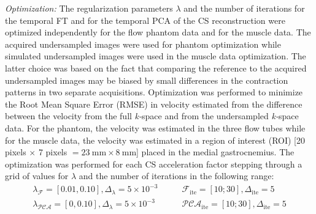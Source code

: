 \textit{Optimization:}
 The regularization parameters $\lambda$ and the number of iterations for the temporal FT and for the temporal PCA of the CS reconstruction were optimized independently for the flow phantom data and for the muscle data. 
 The acquired undersampled images were used for phantom optimization while simulated undersampled images were used in the muscle data optimization. 
 The latter choice was based on the fact that comparing the reference to the acquired undersampled images may be biased by small differences in the contraction patterns in two separate acquisitions. 
 Optimization was performed to minimize the Root Mean Square Error (RMSE) in velocity estimated from the difference between the velocity from the full \mbox{\textit{k-}space} and from the undersampled \mbox{\textit{k-}space} data. 
 For the phantom, the velocity was estimated in the three flow tubes while for the muscle data, the velocity was estimated in a region of interest (ROI) [20 pixels $\times$ 7 pixels $= \SI{23}{\milli\meter} \times \SI{8}{\milli\meter}$] placed in the medial gastrocnemius. 
 The optimization was performed for each CS acceleration factor stepping through a grid of values for $\lambda$ and the number of iterations in the following range: 
\begin{align}\label{eq: CS6}
\lambda_{\mathcal{F}} = \left[ 0.01, 0.10\right], \Delta_{\lambda} = 5\times10^{-3} \qquad & \mathcal{F}_\text{ite} = [10;30], \Delta_{\text{ite}}=5 \\
\lambda_{\mathcal{PCA}} = \left[ 0, 0.10\right], \Delta_{\lambda} = 5\times10^{-3} \qquad & \mathcal{PCA}_\text{ite} = [10;30], \Delta_{\text{ite}}=5 
\end{align}
